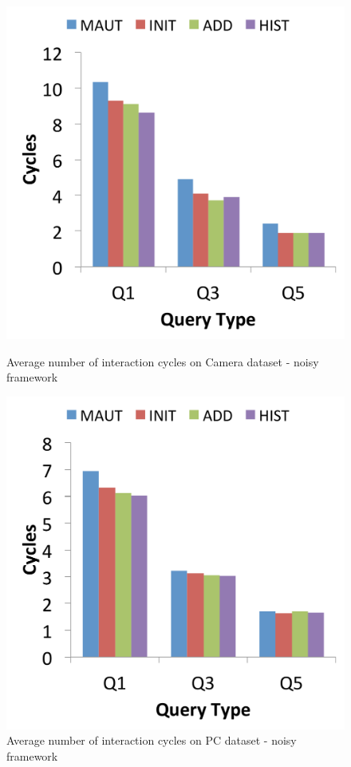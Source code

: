 \begin{figure}[h]
\centering
\begin{minipage}{.45\textwidth}
  \centering
  \includegraphics[width=1\linewidth]{figures-bharath/finalMix_camera_noisy}
  \caption[]{Average number of interaction cycles on Camera dataset - noisy framework}
  \label{fig:finalMix_camera_noisy}
\end{minipage}%
\;\;\;\;\;\;
\begin{minipage}{.45\textwidth}
  \centering
  \includegraphics[width=1\linewidth]{figures-bharath/finalMix_pc_noisy}
  \caption[]{Average number of interaction cycles on PC dataset - noisy framework}
  \label{fig:finalMix_pc_noisy}
\end{minipage}
\end{figure}
